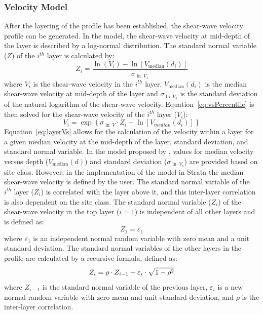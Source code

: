 \documentclass[12pt,oneside]{book}
\begin{document}
\subsubsection{Velocity Model}

After the layering of the profile has been established, the shear-wave velocity profile can be
generated.  In the \citet{toro:95} model, the shear-wave velocity at mid-depth of the layer is
described by a log-normal distribution.  The standard normal variable ($Z$) of the $i^{th}$ layer is
calculated by:
\begin{equation}
    Z_i = \frac{\ln(V_i) - \ln[ V_\text{median}(d_i)]}{\sigma_{\ln\ V_s}}
    \label{eq:vsPercentile}
\end{equation}
where $V_i$ is the shear-wave velocity in the $i^{th}$ layer, $V_\text{median}(d_i)$ is the median
shear-wave velocity at mid-depth of the layer and $\sigma_{\ln\ V_s}$ is the standard deviation of the
natural logarithm of the shear-wave velocity.  Equation~\ref{eq:vsPercentile} is then solved for the
shear-wave velocity of the $i^{th}$ layer ($V_i$):
\begin{equation}
    V_i = \exp \left\{ \sigma_{\ln\ V} \cdot Z_i + \ln \left[ V_{median}(d_i) \right] \right\}
    \label{eq:layerVs}
\end{equation}
Equation~\ref{eq:layerVs} allows for the calculation of the velocity within a layer for a given
median velocity at the mid-depth of the layer, standard deviation, and standard normal variable.  In
the model proposed by \citet{toro:95}, values for median velocity versus depth ($V_\text{median}(d)$) and
standard deviation ($\sigma_{\ln\ V_s}$) are provided based on site class. However, in the
implementation of the \citet{toro:95} model in Strata the median shear-wave velocity is defined by
the user.  The standard normal variable of the $i^{th}$ layer ($Z_i$) is correlated with the layer
above it, and this inter-layer correlation is also dependent on the site class.  The standard normal
variable ($Z_i$) of the shear-wave velocity in the top layer ($i=1$) is independent of all other
layers and is defined as:
\begin{equation}
    Z_1 = \varepsilon_1
\end{equation}
where $\varepsilon_1$ is an independent normal random variable with zero mean and a unit standard
deviation.  The standard normal variables of the other layers in the profile are calculated by a
recursive formula, defined as:
\begin{equation}
    Z_i = \rho \cdot Z_{i-1} + \varepsilon_i \cdot \sqrt{1 - \rho^2} \\
\end{equation}
where $Z_{i-1}$ is the standard normal variable of the previous layer, $\varepsilon_i$ is a new
normal random variable with zero mean and unit standard deviation, and $\rho$ is the inter-layer
correlation.  
\end{document}
